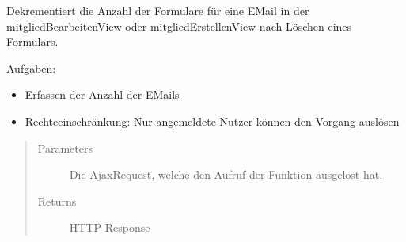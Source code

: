 \documentclass[letterpaper,10pt,english]{sphinxmanual}
\begin{document}
\begin{fulllineitems}
\label{\detokenize{masterCodeDoc:mitglieder.views.email_loeschen}}
Dekrementiert die Anzahl der Formulare für eine E\sphinxhyphen{}Mail in der mitgliedBearbeitenView oder mitgliedErstellenView nach Löschen eines Formulars.

Aufgaben:
\begin{itemize}
\item {} 
Erfassen der Anzahl der E\sphinxhyphen{}Mails

\item {} 
Rechteeinschränkung: Nur angemeldete Nutzer können den Vorgang auslösen

\end{itemize}
\begin{quote}\begin{description}
\item[{Parameters}] \leavevmode
{} \textendash{} Die Ajax\sphinxhyphen{}Request, welche den Aufruf der Funktion ausgelöst hat.

\item[{Returns}] \leavevmode
HTTP Response

\end{description}\end{quote}

\end{fulllineitems}

\end{document}

